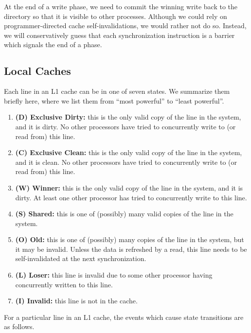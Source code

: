 \documentclass{article}
\begin{document}
At the end of a write phase, we need to commit the winning write back to the directory so that it is visible to other processes. Although we could rely on programmer-directed cache self-invalidations, we would rather not do so. Instead, we will conservatively guess that each synchronization instruction is a barrier which signals the end of a phase.

\subsection{Local Caches}
Each line in an L1 cache can be in one of seven states. We summarize them briefly here, where we list them from ``most powerful'' to ``least powerful''.

\begin{enumerate}
\item \textbf{(D) Exclusive Dirty:} this is the only valid copy of the line in the system, and it is dirty. No other processors have tried to concurrently write to (or read from) this line.
\item \textbf{(C) Exclusive Clean:} this is the only valid copy of the line in the system, and it is clean. No other processors have tried to concurrently write to (or read from) this line.
\item \textbf{(W) Winner:} this is the only valid copy of the line in the system, and it is dirty. At least one other processor has tried to concurrently write to this line.
\item \textbf{(S) Shared:} this is one of (possibly) many valid copies of the line in the system.
\item \textbf{(O) Old:} this is one of (possibly) many copies of the line in the system, but it may be invalid. Unless the data is refreshed by a read, this line needs to be self-invalidated at the next synchronization.
\item \textbf{(L) Loser:} this line is invalid due to some other processor having concurrently written to this line.
\item \textbf{(I) Invalid:} this line is not in the cache.
\end{enumerate}

For a particular line in an L1 cache, the events which cause state transitions are as follows.
\end{document}

